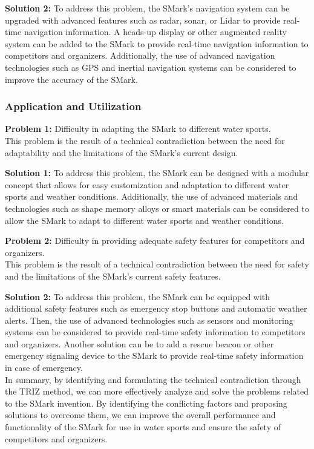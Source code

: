 \documentclass[12pt, twoside]{report}
\begin{document}
\textbf{Solution 2:} To address this problem, the SMark's navigation system can be upgraded with advanced features such as radar, sonar, or Lidar to provide real-time navigation information. A heads-up display or other augmented reality system can be added to the SMark to provide real-time navigation information to competitors and organizers. Additionally, the use of advanced navigation technologies such as GPS and inertial navigation systems can be considered to improve the accuracy of the SMark.

\subsubsection{Application and Utilization}

\textbf{Problem 1:} Difficulty in adapting the SMark to different water sports.\\
This problem is the result of a technical contradiction between the need for adaptability and the limitations of the SMark's current design.

\textbf{Solution 1:} To address this problem, the SMark can be designed with a modular concept that allows for easy customization and adaptation to different water sports and weather conditions. Additionally, the use of advanced materials and technologies such as shape memory alloys or smart materials can be considered to allow the SMark to adapt to different water sports and weather conditions.

\textbf{Problem 2:} Difficulty in providing adequate safety features for competitors and organizers.\\
This problem is the result of a technical contradiction between the need for safety and the limitations of the SMark's current safety features.

\textbf{Solution 2:} To address this problem, the SMark can be equipped with additional safety features such as emergency stop buttons and automatic weather alerts. Then, the use of advanced technologies such as sensors and monitoring systems can be considered to provide real-time safety information to competitors and organizers. Another solution can be to add a rescue beacon or other emergency signaling device to the SMark to provide real-time safety information in case of emergency.\\

In summary, by identifying and formulating the technical contradiction through the TRIZ method, we can more effectively analyze and solve the problems related to the SMark invention. By identifying the conflicting factors and proposing solutions to overcome them, we can improve the overall performance and functionality of the SMark for use in water sports and ensure the safety of competitors and organizers.
\end{document}
